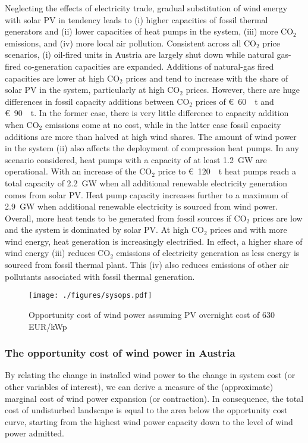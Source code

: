 \documentclass[review, 3p, times, 12pt]{elsarticle} %
\newcommand{\COO}{\ensuremath{\mathrm{CO_2}} }
\begin{document}
Neglecting the effects of electricity trade, gradual substitution of wind energy with solar PV in tendency leads to (i) higher capacities of fossil thermal
generators and (ii) lower capacities of heat pumps in the system, (iii) more \COO emissions, and (iv) more local
air pollution.
Consistent across all \COO price scenarios, (i) oil-fired units in Austria are largely shut down while natural gas-fired
co-generation capacities are expanded.
Additions of natural-gas fired capacities are lower at high \COO prices and tend to increase with the share of solar
PV in the system, particularly at high \COO prices.
However, there are huge differences in fossil capacity additions between \COO prices of \SI{60}[\euro]{\per\tonne}
and \SI{90}[\euro]{\per\tonne}.
In the former case, there is very little difference to capacity addition when \COO emissions come at no cost, while
in the latter case fossil capacity additions are more than halved at high wind shares.
The amount of wind power in the system (ii) also affects the deployment of compression heat pumps.
In any scenario considered, heat pumps with a capacity of at least \SI{1.2}{\giga\watt} are operational.
With an increase of the \COO price to \SI{120}[\euro]{\per\tonne} heat pumps reach a total capacity of
\SI{2.2}{\giga\watt} when all additional renewable electricity generation comes from solar PV\@.
Heat pump capacity increases further to a maximum of \SI{2.9}{\giga\watt} when additional renewable electricity is
sourced from wind power.
Overall, more heat tends to be generated from fossil sources if \COO prices are low and the system is dominated by
solar PV\@.
At high \COO prices and with more wind energy, heat generation is increasingly electrified.
In effect, a higher share of wind energy (iii) reduces \COO emissions of electricity generation as less energy is sourced from fossil thermal plant.
This (iv) also reduces emissions of other air pollutants associated with fossil thermal generation.

\begin{figure*}
\centering
\texttt{[image: ./figures/sysops.pdf]}
\caption{Opportunity cost of wind power assuming PV overnight cost of 630 EUR/kWp}
\label{figure:system-operation-base}
\end{figure*}

\subsubsection{The opportunity cost of wind power in Austria}\label{subsec:opportunity-cost-wind}
By relating the change in installed wind power to the change in system cost (or other variables of interest), we
can derive a measure of the (approximate) marginal cost of wind power expansion (or contraction).
In consequence, the total cost of undisturbed landscape is equal to the area below the opportunity cost curve,
starting from the highest wind power capacity down to the level of wind power admitted.
\end{document}
